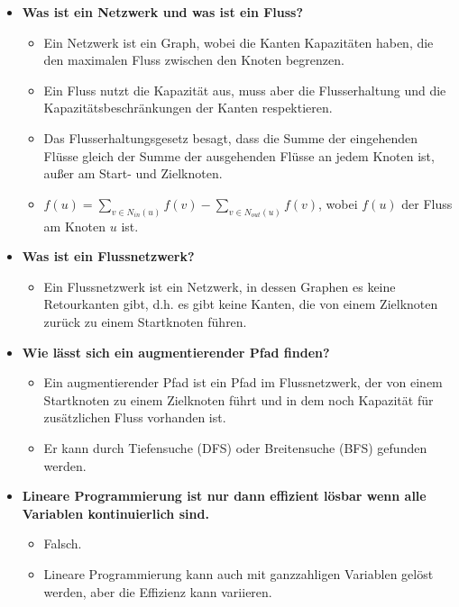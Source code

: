 \documentclass[12pt]{scrartcl}
\begin{document}
\begin{itemize}
\begin{itemize}
          \end{itemize}
    \item \textbf{Was ist ein Netzwerk und was ist ein Fluss?}
          \begin{itemize}
              \item Ein Netzwerk ist ein Graph, wobei die Kanten Kapazitäten haben, die den maximalen Fluss zwischen den Knoten begrenzen.
              \item Ein Fluss nutzt die Kapazität aus, muss aber die Flusserhaltung und die Kapazitätsbeschränkungen der Kanten respektieren.
              \item Das Flusserhaltungsgesetz besagt, dass die Summe der eingehenden Flüsse gleich der Summe der ausgehenden Flüsse an jedem Knoten ist, außer am Start- und Zielknoten.
              \item $f(u) = \sum_{v \in N_{in}(u)} f(v) - \sum_{v \in N_{out}(u)} f(v)$, wobei $f(u)$ der Fluss am Knoten $u$ ist.
          \end{itemize}
    \item \textbf{Was ist ein Flussnetzwerk?}
          \begin{itemize}
              \item Ein Flussnetzwerk ist ein Netzwerk, in dessen Graphen es keine Retourkanten gibt, d.h. es gibt keine Kanten, die von einem Zielknoten zurück zu einem Startknoten führen.
          \end{itemize}
    \item \textbf{Wie lässt sich ein augmentierender Pfad finden?}
          \begin{itemize}
              \item Ein augmentierender Pfad ist ein Pfad im Flussnetzwerk, der von einem Startknoten zu einem Zielknoten führt und in dem noch Kapazität für zusätzlichen Fluss vorhanden ist.
              \item Er kann durch Tiefensuche (DFS) oder Breitensuche (BFS) gefunden werden.
          \end{itemize}
    \item \textbf{Lineare Programmierung ist nur dann effizient lösbar wenn alle Variablen kontinuierlich sind.}
          \begin{itemize}
              \item Falsch.
              \item Lineare Programmierung kann auch mit ganzzahligen Variablen gelöst werden, aber die Effizienz kann variieren.
          \end{itemize}
\end{itemize}
\end{document}

